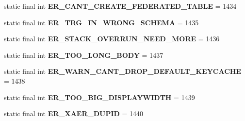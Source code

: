 \begin{DoxyCompactItemize}
\item 
\mbox{\label{classcom_1_1mysql_1_1jdbc_1_1_mysql_error_numbers_ab25d0a1a5b0f342163cb53f5c06cbfd9}} 
static final int {\bfseries E\+R\+\_\+\+C\+A\+N\+T\+\_\+\+C\+R\+E\+A\+T\+E\+\_\+\+F\+E\+D\+E\+R\+A\+T\+E\+D\+\_\+\+T\+A\+B\+LE} = 1434
\item 
\mbox{\label{classcom_1_1mysql_1_1jdbc_1_1_mysql_error_numbers_a67bb0f9c05533cf8f600fe487186a8e4}} 
static final int {\bfseries E\+R\+\_\+\+T\+R\+G\+\_\+\+I\+N\+\_\+\+W\+R\+O\+N\+G\+\_\+\+S\+C\+H\+E\+MA} = 1435
\item 
\mbox{\label{classcom_1_1mysql_1_1jdbc_1_1_mysql_error_numbers_a61be6f3794154e1945527edc6efd0221}} 
static final int {\bfseries E\+R\+\_\+\+S\+T\+A\+C\+K\+\_\+\+O\+V\+E\+R\+R\+U\+N\+\_\+\+N\+E\+E\+D\+\_\+\+M\+O\+RE} = 1436
\item 
\mbox{\label{classcom_1_1mysql_1_1jdbc_1_1_mysql_error_numbers_a4a22a828060aa29ea88244abd3291831}} 
static final int {\bfseries E\+R\+\_\+\+T\+O\+O\+\_\+\+L\+O\+N\+G\+\_\+\+B\+O\+DY} = 1437
\item 
\mbox{\label{classcom_1_1mysql_1_1jdbc_1_1_mysql_error_numbers_abbc086bc3803e29ed8b3e4606497ffcc}} 
static final int {\bfseries E\+R\+\_\+\+W\+A\+R\+N\+\_\+\+C\+A\+N\+T\+\_\+\+D\+R\+O\+P\+\_\+\+D\+E\+F\+A\+U\+L\+T\+\_\+\+K\+E\+Y\+C\+A\+C\+HE} = 1438
\item 
\mbox{\label{classcom_1_1mysql_1_1jdbc_1_1_mysql_error_numbers_a3366db27460b4b8005bbc2f5f27b81a7}} 
static final int {\bfseries E\+R\+\_\+\+T\+O\+O\+\_\+\+B\+I\+G\+\_\+\+D\+I\+S\+P\+L\+A\+Y\+W\+I\+D\+TH} = 1439
\item 
\mbox{\label{classcom_1_1mysql_1_1jdbc_1_1_mysql_error_numbers_ae507cc7b4490416a6aa781cc07d38fe9}} 
static final int {\bfseries E\+R\+\_\+\+X\+A\+E\+R\+\_\+\+D\+U\+P\+ID} = 1440
\item 
\mbox{\label{classcom_1_1mysql_1_1jdbc_1_1_mysql_error_numbers_a5360955e6b47ba1e4dcca113c5621b30}} 

\end{DoxyCompactItemize}
